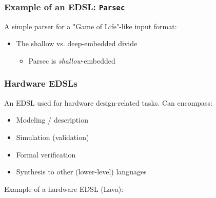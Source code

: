         \begin{frame}
            \frametitle{Example of an EDSL: \texttt{Parsec}}

            A simple parser for a "Game of Life"-like input format:

            \vspace{0.2cm}
            \begin{itemize}
                \item The shallow vs. deep-embedded divide
                    \begin{itemize}
                        \item Parsec is \emph{shallow}-embedded
                    \end{itemize}
            \end{itemize}

        \end{frame}

        \begin{frame}
            \frametitle{Hardware EDSLs}
            An EDSL used for hardware design-related tasks. Can encompass:

            \begin{itemize}
                \item Modeling / description
                \item Simulation (validation)
                \item Formal verification
                \item Synthesis to other (lower-level) languages
            \end{itemize}

            \vspace{0.5cm}
            \par{Example of a hardware EDSL (Lava):}
            \vspace{0.2cm}
        \end{frame}

